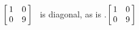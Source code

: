 {$\left[\hskip -3pt \begin{array}{cc} 1&0\\  0&9\end {array} \hskip -3pt
 \right] $} 
{\tta\ is diagonal, as is \ttat.$\left[\hskip -3pt \begin{array}{cc} 1&0\\  0&9\end{array}\hskip -3pt \right]$}


  

